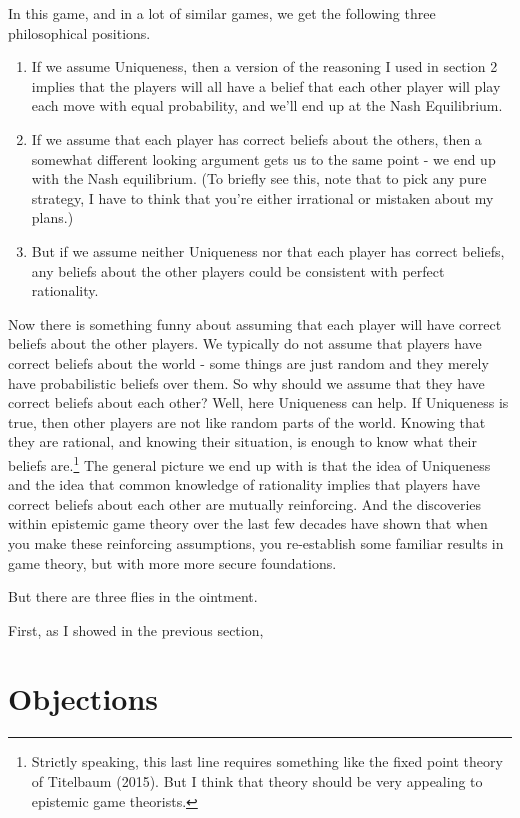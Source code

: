 \documentclass[12pt,]{article}
\providecommand{\tightlist}{%
  \setlength{\itemsep}{0pt}\setlength{\parskip}{0pt}}
\let\rmarkdownfootnote\footnote%
\def\footnote{\protect\rmarkdownfootnote}
\begin{document}
In this game, and in a lot of similar games, we get the following three philosophical positions.

\begin{enumerate}
\def\labelenumi{\arabic{enumi}.}
\tightlist
\item
  If we assume Uniqueness, then a version of the reasoning I used in section 2 implies that the players will all have a belief that each other player will play each move with equal probability, and we'll end up at the Nash Equilibrium.
\item
  If we assume that each player has correct beliefs about the others, then a somewhat different looking argument gets us to the same point - we end up with the Nash equilibrium. (To briefly see this, note that to pick any pure strategy, I have to think that you're either irrational or mistaken about my plans.)
\item
  But if we assume neither Uniqueness nor that each player has correct beliefs, any beliefs about the other players could be consistent with perfect rationality.
\end{enumerate}

Now there is something funny about assuming that each player will have correct beliefs about the other players. We typically do not assume that players have correct beliefs about the world - some things are just random and they merely have probabilistic beliefs over them. So why should we assume that they have correct beliefs about each other? Well, here Uniqueness can help. If Uniqueness is true, then other players are not like random parts of the world. Knowing that they are rational, and knowing their situation, is enough to know what their beliefs are.\footnote{Strictly speaking, this last line requires something like the fixed point theory of Titelbaum (2015). But I think that theory should be very appealing to epistemic game theorists.} The general picture we end up with is that the idea of Uniqueness and the idea that common knowledge of rationality implies that players have correct beliefs about each other are mutually reinforcing. And the discoveries within epistemic game theory over the last few decades have shown that when you make these reinforcing assumptions, you re-establish some familiar results in game theory, but with more more secure foundations.

But there are three flies in the ointment.

First, as I showed in the previous section,

\hypertarget{objections}{%
\section{Objections}\label{objections}}
\end{document}
